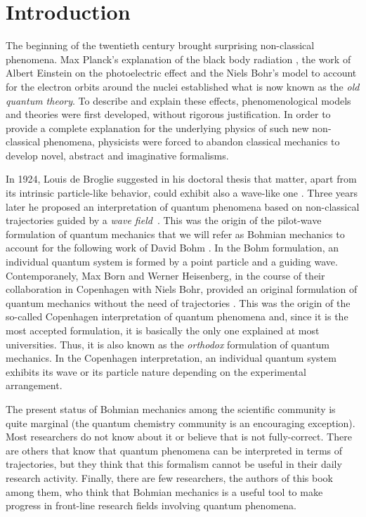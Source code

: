 \documentclass[nofootinbib, secnumarabic, amsmath, nobibnotes,11pt,aps,pra, floatfix]{revtex4-1}
\begin{document}
\section{Introduction \label{introduction}}


The beginning of the twentieth century brought surprising non-classical phenomena. Max Planck's explanation of the black body radiation \cite{om.Planck-BlackBody}, the work of Albert Einstein on the photoelectric effect \cite{om.Einstein-Photoelectric} and the Niels Bohr's model to account for the electron orbits around the nuclei \cite{om.bohr,om.bohr2,om.bohr3} established what is now known as the \textit{old quantum theory}.
To describe and explain these effects, phenomenological models and theories were first developed, without rigorous justification. In order to provide a complete explanation for the underlying physics of such new non-classical phenomena, physicists were forced to abandon classical mechanics to develop novel, abstract and imaginative formalisms.

In 1924, Louis de Broglie suggested in his doctoral thesis that matter, apart from its intrinsic particle-like behavior, could exhibit also a wave-like one \cite{om.dB_AnnPhys}. Three years later he proposed an interpretation of quantum phenomena based on non-classical trajectories guided by a \emph{wave field}~\cite{om.debroglie1927b}.
This was the origin of the pilot-wave formulation of quantum mechanics that we will refer as Bohmian mechanics to account for the following work of David Bohm \cite{om.bohm1952a,om.bohm1952b}. In the Bohm formulation, an individual quantum system is formed by a point particle and a guiding wave.
Contemporanely, Max Born and Werner Heisenberg, in the course of their collaboration in Copenhagen with Niels Bohr, provided an original formulation of quantum mechanics without the need of trajectories \cite{om.Born1926,om.Heisenber1925}. This was the origin of the so-called Copenhagen interpretation of quantum phenomena and, since it is the most accepted formulation, it is basically the only one explained at most universities. Thus, it is also known as the \emph{orthodox} formulation of quantum mechanics. In the Copenhagen interpretation, an individual quantum system exhibits its wave or its particle nature depending on the experimental arrangement.

The present status of Bohmian mechanics among the scientific community is quite marginal (the quantum chemistry community is an encouraging exception). Most researchers do not know about it or believe that is not fully-correct. There are others that know that quantum phenomena can be interpreted in terms of trajectories, but they think that this formalism cannot be useful in their daily research activity. Finally, there are few researchers, the authors of this book among them, who think that Bohmian mechanics is a useful tool to make progress in front-line research fields involving quantum phenomena.
\end{document}
